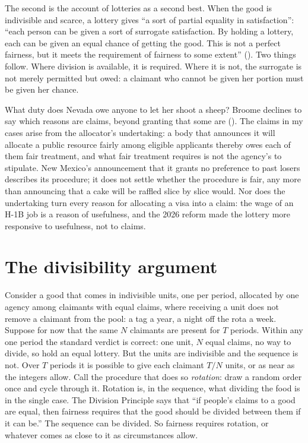 \documentclass[
  11pt,
  letterpaper,
  DIV=11,
  numbers=noendperiod,
  twoside]{scrartcl}
\begin{document}
The second is the account of lotteries as a second best. When the good
is indivisible and scarce, a lottery gives ``a sort of partial equality
in satisfaction'': ``each person can be given a sort of surrogate
satisfaction. By holding a lottery, each can be given an equal chance of
getting the good. This is not a perfect fairness, but it meets the
requirement of fairness to some extent''
(). Two things follow.
Where division is available, it is required. Where it is not, the
surrogate is not merely permitted but owed: a claimant who cannot be
given her portion must be given her chance.

What duty does Nevada owe anyone to let her shoot a sheep? Broome
declines to say which reasons are claims, beyond granting that some are
(). The claims in my
cases arise from the allocator's undertaking: a body that announces it
will allocate a public resource fairly among eligible applicants thereby
owes each of them fair treatment, and what fair treatment requires is
not the agency's to stipulate. New Mexico's announcement that it grants
no preference to past losers describes its procedure; it does not settle
whether the procedure is fair, any more than announcing that a cake will
be raffled slice by slice would. Nor does the undertaking turn every
reason for allocating a visa into a claim: the wage of an H-1B job is a
reason of usefulness, and the 2026 reform made the lottery more
responsive to usefulness, not to claims.

\section{The divisibility argument}\label{sec-division}

Consider a good that comes in indivisible units, one per period,
allocated by one agency among claimants with equal claims, where
receiving a unit does not remove a claimant from the pool: a tag a year,
a night off the rota a week. Suppose for now that the same \(N\)
claimants are present for \(T\) periods. Within any one period the
standard verdict is correct: one unit, \(N\) equal claims, no way to
divide, so hold an equal lottery. But the units are indivisible and the
sequence is not. Over \(T\) periods it is possible to give each claimant
\(T/N\) units, or as near as the integers allow. Call the procedure that
does so \emph{rotation}: draw a random order once and cycle through it.
Rotation is, in the sequence, what dividing the food is in the single
case. The Division Principle says that ``if people's claims to a good
are equal, then fairness requires that the good should be divided
between them if it can be.'' The sequence can be divided. So fairness
requires rotation, or whatever comes as close to it as circumstances
allow.
\end{document}
